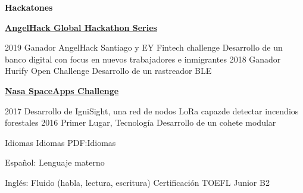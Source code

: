 \documentclass[letterpaper,yyyy,draft]{simpleresumecv}
\begin{document}
\begin{Body}
{    \Gap{}
    \Entry{}
    \textbf{Hackatones}
    {
        {
            \BulletItem{}
            \href{https://angelhack.com}{\textbf{AngelHack Global Hackathon Series}}
            \hfill
            \begin{Detail}
            \Gap{}
            \SubBulletItem{}
            2019 \- Ganador AngelHack Santiago y EY Fintech challenge \- \newline Desarrollo de un banco digital con focus en nuevos trabajadores e inmigrantes
            \Gap{}
            \SubBulletItem{}
            2018 \- Ganador Hurify Open Challenge \- Desarrollo de un rastreador BLE
            \end{Detail}
        }
        {
            \Gap{}
            \BulletItem{}
            \href{https://spaceappschallenge.org}{\textbf{Nasa SpaceApps Challenge}}
            \hfill
            \begin{Detail}
            \Gap{}
            \SubBulletItem{}
            2017 \- Desarrollo de IgniSight, una red de nodos LoRa capaz\newline de detectar incendios forestales
            \Gap{}
            \SubBulletItem{}
            2016 \- Primer Lugar, Tecnología \- Desarrollo de un cohete modular
            \end{Detail}
        }
    }
}


\Section
{Idiomas}
{Idiomas}
{PDF:Idiomas}
{
    {
        \BulletItem{}
        Español: Lenguaje materno
    }

    \Gap{}

    {
        \BulletItem{}
        Inglés: Fluido (habla, lectura, escritura)
        \SubBulletItem{}
        Certificación TOEFL Junior B2
    }
}
\end{Body}
\end{document}
